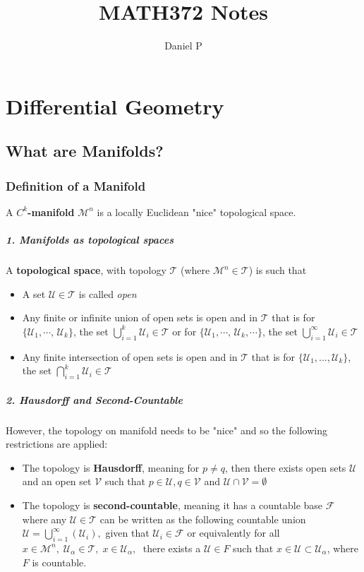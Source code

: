\documentclass[11pt]{report}
\title{MATH372 Notes}
\author{Daniel P}
\date{}
\theoremstyle{thm}
\newcommand{\textem}[1]{\textcolor{mp}{\textbf{#1}}}
\begin{document}
    	    \maketitle
\part{Differential Geometry}
\chapter{What are Manifolds?}
\section{Definition of a Manifold}
A \textem{$C^k$-manifold} $\mathcal	{M}^n$ is a locally Euclidean "nice" 
topological space.
\subsubsection{1. Manifolds as topological spaces}
A \textem{topological space}, with topology $\mathcal{T}$ 
(where $\mathcal{M}^n\in \mathcal{T}$) is such that
	\begin{itemize}
\item A set $\mathcal{U}\in \mathcal{T}$ is called \textit{open}
\item Any finite or infinite union of open sets is open and in $\mathcal{T}$ 
that is for $\{\mathcal{U}_1, \cdots,\,\mathcal{U}_k\}$, the set 
$\bigcup_{i=1}^{k}{\mathcal{U}_i}\in \mathcal{T}$ or for 
$\{\mathcal{U}_1,\cdots,  \,\mathcal{U}_k,\cdots \}$, the set 
$\bigcup_{i=1}^{\infty}{\mathcal{U}_i}\in \mathcal{T}$
		\item Any finite intersection of open sets is open and in $\mathcal{T}$ 
		that is for $\{\mathcal{U}_1, ...,  \mathcal{U}_k\}$, the set 
		$\bigcap_{i=1}^{k}{\mathcal{U}_i}\in \mathcal{T}$
\end{itemize}
\subsubsection{2. Hausdorff and Second-Countable}
However, the topology on manifold needs to be "nice" and so the following 
restrictions are applied:
\begin{itemize} 
\item 
The topology is \textem{Hausdorff}, meaning for $p\ne q$, then there exists open sets $\mathcal{U}$ and an open set $\mathcal{V}$ such that $p\in \mathcal{U}, q\in \mathcal{V}$ and $\mathcal{U} \cap \mathcal{V} = \emptyset$
\item The topology is \textem{second-countable}, meaning it has a countable 
base $\mathcal{F}$ where any $\mathcal{U}\in \mathcal{T}$ can be written as the 
following countable union 
$\mathcal{U}=\displaystyle\bigcup_{i=1}^{\infty}(\mathcal{U}_i),$ given that 
$\mathcal{U}_i\in \mathcal{F}$ or equivalently for all $x\in 
\mathcal{M}^n,\;\mathcal{U}_\alpha \in \mathcal{T},\; 	x\in 
\mathcal{U}_\alpha,\;$ there exists a $\mathcal{U}\in F$ such that $x\in 
\mathcal{U} \subset \mathcal{U}_\alpha$, where $F$ is countable.
\end{itemize}
\end{document}
